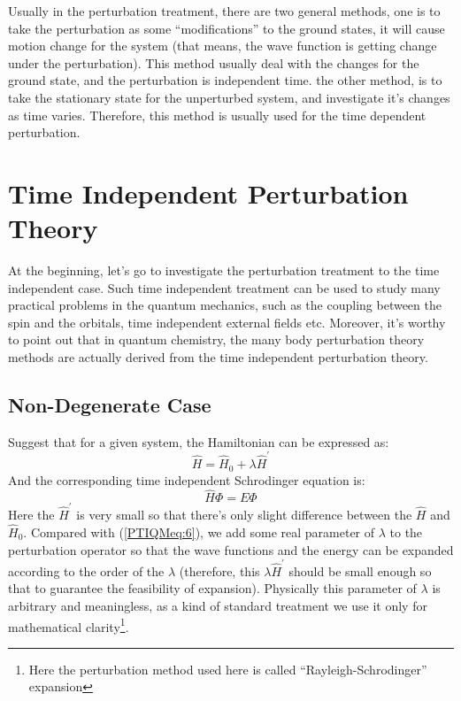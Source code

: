 Usually in the perturbation treatment, there are two general
methods\cite{Dirac}, one is to take the perturbation as some
``modifications'' to the ground states, it will cause motion change
for the system (that means, the wave function is getting change
under the perturbation). This method usually deal with the changes
for the ground state, and the perturbation is independent time. the
other method, is to take the stationary state for the unperturbed
system, and investigate it's changes as time varies. Therefore, this
method is usually used for the time dependent perturbation.

\section{Time Independent Perturbation
Theory}\label{Time_independent_perturbation_theory}
%
%
At the beginning, let's go to investigate the perturbation treatment
to the time independent case. Such time independent treatment can be
used to study many practical problems in the quantum mechanics, such
as the coupling between the spin and the orbitals, time independent
external fields etc. Moreover, it's worthy to point out that in
quantum chemistry, the many body perturbation theory methods are
actually derived from the time independent perturbation theory.

\subsection{Non-Degenerate Case}
%
%
Suggest that for a given system, the Hamiltonian can be expressed
as:
\begin{equation}\label{PTIQMeq:1}
\hat{H} = \hat{H}_{0} + \lambda\hat{H}^{'}
\end{equation}
And the corresponding time independent Schrodinger equation is:
\begin{equation}\label{PTIQMeq:2}
\hat{H}\Phi = E\Phi
\end{equation}
Here the $\hat{H}^{'}$ is very small so that there's only slight
difference between the $\hat{H}$ and $\hat{H}_{0}$. Compared with
(\ref{PTIQMeq:6}), we add some real parameter of $\lambda$ to the
perturbation operator so that the wave functions and the energy can
be expanded according to the order of the $\lambda$ (therefore, this
$\lambda\hat{H}^{'}$ should be small enough so that to guarantee the
feasibility of expansion). Physically this parameter of $\lambda$ is
arbitrary and meaningless, as a kind of standard treatment we use it
only for mathematical clarity\footnote{Here the perturbation method
used here is called ``Rayleigh-Schrodinger'' expansion}.


